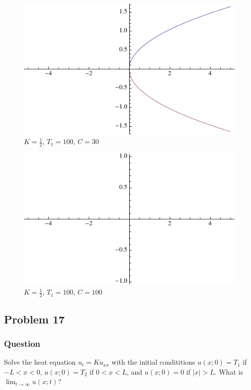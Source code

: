 \documentclass[12pt]{article}
\begin{document}
   \begin{figure}
      \centering
      \includegraphics{c30.pdf}
      \caption{$K= \frac{1}{2}$, $T_1=100$, $C=30$}
   \end{figure}

   \begin{figure}
      \centering
      \includegraphics{c100.pdf}
      \caption{$K= \frac{1}{2}$, $T_1=100$, $C=100$}
   \end{figure}


\subsection{Problem 17}
\subsubsection{Question}

Solve the heat equation $u_t=K u_{xx}$ with the initial condititions $u(x;0)=T_1$ if $-L<x<0$, $u(x;0)=T_2$ if $0<x<L$, and $u(x;0)=0$ if $|x|>L$. What is $\lim_{t \to \infty}u(x;t)$?
\end{document}
